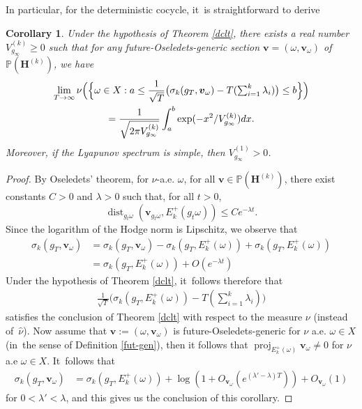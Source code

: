 \documentclass[JEP,XML,SOM,Unicode,published]{cedram}
\DeclareMathOperator{\dist}{dist}
\DeclareMathOperator{\proj}{proj}
\theoremstyle{plain}
\newtheorem{cor}[thm]{Corollary}
\theoremstyle{definition}
\numberwithin{equation}{subsection}
\newcommand\bP{\mathbb{P}}
\newcommand{\bfH}{\boldsymbol{H}}
\newcommand{\bfv}{\boldsymbol{v}}
\newcommand{\defeq}{:=}
\begin{document}
In particular, for the deterministic cocycle, it~is straightforward to derive

\begin{cor}
Under the hypothesis of Theorem \ref{dclt}, there exists a real number $V^{(k)}_{g_\infty} \geq 0$ such that for any future-Oseledets-generic section $\bfv=(\omega,\bfv_{\omega})$ of $\bP(\bfH^{(k)})$, we have
\begin{multline*}
\lim_{T\to\infty} \nu\Bigl(\Bigl\{\omega\in X :a \leq \frac{1}{\sqrt{T}} \bigl(\sigma_k(g_{T}, \bfv_\omega)- T(\textstyle\sum_{i=1}^k \lambda_i) \bigr) \leq b\Bigr\}\Bigr)
\\= \frac{1}{\sqrt{2\pi V^{(k)}_{g_\infty}}}\int_a^b\exp(-x^2/ V^{(k)}_{g_\infty})dx.
\end{multline*}
Moreover, if the Lyapunov spectrum is simple, then $V^{(1)}_{g_\infty} > 0$.
\end{cor}

\begin{proof}
By Oseledets' theorem, for $\nu$-a.e. $\omega$, for all $\bfv \in \bP(\bfH^{(k)})$, there exist constants $C>0$ and $\lambda >0$ such that, for all $t>0$,
\[
\dist_{g_t\omega} (\bfv_{g_t \omega}, E^+_k(g_t \omega)) \leq C e^{-\lambda t}.
\]
Since the logarithm of the Hodge norm is Lipschitz, we observe that
\begin{align*}
\sigma_k(g_{T}, \bfv_\omega)&= \sigma_k(g_{T}, \bfv_\omega)-\sigma_k(g_{T}, E^+_k(\omega))+ \sigma_k(g_{T}, E^+_k(\omega))\\
&= \sigma_k(g_{T}, E^+_k(\omega))+O(e^{-\lambda t})
\end{align*}
Under the hypothesis of Theorem \ref{dclt}, it~follows therefore that
\begin{align*}
\frac{1}{\sqrt{T}} \bigl(\sigma_k(g_{T}, E^+_k(\omega))- T(\textstyle\sum_{i=1}^k \lambda_i) \bigr)
\end{align*}
satisfies the conclusion of Theorem \ref{dclt} with respect to the measure $\nu$ (instead of~$\hat{\nu}$). Now assume that $\bfv\defeq(\omega,\bfv_{\omega})$ is future-Oseledets-generic for $\nu$ a.e. $\omega\in X$ (in~the sense of Definition \ref{fut-gen}), then it follows that $\proj_{E^+_k(\omega)}\bfv_{ \omega} \neq 0$ for $\nu$ a.e $\omega\in X$. It~follows that
\begin{align*}
\sigma_k(g_{T}, \bfv_\omega)&= \sigma_k(g_{T}, E^+_k(\omega))+\log(1+O_{\bfv_\omega}(e^{(\lambda'-\lambda)T}))+O_{\bfv_\omega}(1)
\end{align*}
for $0<\lambda'<\lambda$, and this gives us the conclusion of this corollary.
\end{proof}
\end{document}
